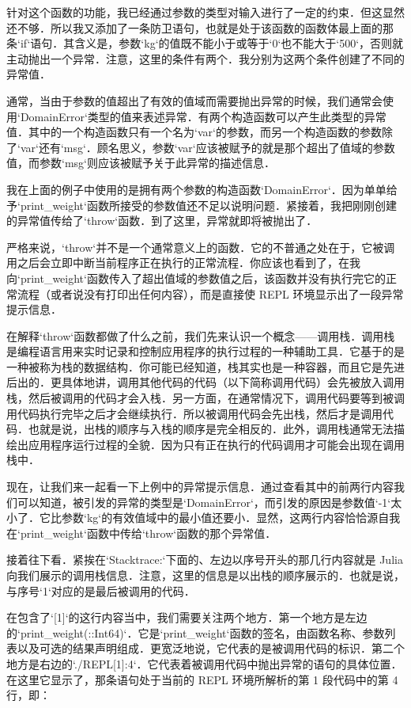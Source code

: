 针对这个函数的功能，我已经通过参数的类型对输入进行了一定的约束．但这显然还不够．所以我又添加了一条防卫语句，也就是处于该函数的函数体最上面的那条`if`语句．其含义是，参数`kg`的值既不能小于或等于`0`也不能大于`500`，否则就主动抛出一个异常．注意，这里的条件有两个．我分别为这两个条件创建了不同的异常值．

通常，当由于参数的值超出了有效的值域而需要抛出异常的时候，我们通常会使用`DomainError`类型的值来表述异常．有两个构造函数可以产生此类型的异常值．其中的一个构造函数只有一个名为`var`的参数，而另一个构造函数的参数除了`var`还有`msg`．顾名思义，参数`var`应该被赋予的就是那个超出了值域的参数值，而参数`msg`则应该被赋予关于此异常的描述信息．

我在上面的例子中使用的是拥有两个参数的构造函数`DomainError`．因为单单给予`print_weight`函数所接受的参数值还不足以说明问题．紧接着，我把刚刚创建的异常值传给了`throw`函数．到了这里，异常就即将被抛出了．

严格来说，`throw`并不是一个通常意义上的函数．它的不普通之处在于，它被调用之后会立即中断当前程序正在执行的正常流程．你应该也看到了，在我向`print_weight`函数传入了超出值域的参数值之后，该函数并没有执行完它的正常流程（或者说没有打印出任何内容），而是直接使 REPL 环境显示出了一段异常提示信息．

在解释`throw`函数都做了什么之前，我们先来认识一个概念——调用栈．调用栈是编程语言用来实时记录和控制应用程序的执行过程的一种辅助工具．它基于的是一种被称为栈的数据结构．你可能已经知道，栈其实也是一种容器，而且它是先进后出的．更具体地讲，调用其他代码的代码（以下简称调用代码）会先被放入调用栈，然后被调用的代码才会入栈．另一方面，在通常情况下，调用代码要等到被调用代码执行完毕之后才会继续执行．所以被调用代码会先出栈，然后才是调用代码．也就是说，出栈的顺序与入栈的顺序是完全相反的．此外，调用栈通常无法描绘出应用程序运行过程的全貌．因为只有正在执行的代码调用才可能会出现在调用栈中．

现在，让我们来一起看一下上例中的异常提示信息．通过查看其中的前两行内容我们可以知道，被引发的异常的类型是`DomainError`，而引发的原因是参数值`-1`太小了．它比参数`kg`的有效值域中的最小值还要小．显然，这两行内容恰恰源自我在`print_weight`函数中传给`throw`函数的那个异常值．

接着往下看．紧挨在`Stacktrace:`下面的、左边以序号开头的那几行内容就是 Julia 向我们展示的调用栈信息．注意，这里的信息是以出栈的顺序展示的．也就是说，与序号`1`对应的是最后被调用的代码．

在包含了`[1]`的这行内容当中，我们需要关注两个地方．第一个地方是左边的`print_weight(::Int64)`．它是`print_weight`函数的签名，由函数名称、参数列表以及可选的结果声明组成．更宽泛地说，它代表的是被调用代码的标识．第二个地方是右边的`./REPL[1]:4`．它代表着被调用代码中抛出异常的语句的具体位置．在这里它显示了，那条语句处于当前的 REPL 环境所解析的第 1 段代码中的第 4 行，即：

